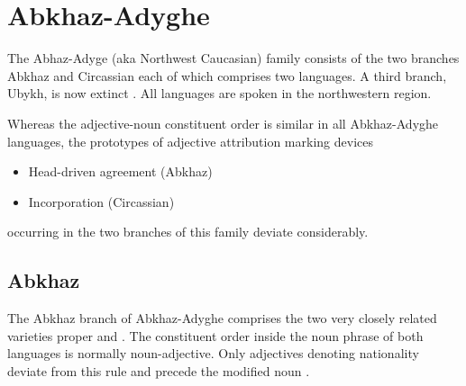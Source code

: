\section{Abkhaz-Adyghe}
The Abhaz-Adyge (aka Northwest Caucasian) family consists of the two branches Abkhaz and Circassian each of which comprises two languages. A third branch, Ubykh, is now extinct \citep[220, 233]{salminen2007}. All languages are spoken in the northwestern  region.

Whereas the adjective-noun constituent order is similar in all Abkhaz-Adyghe languages, the prototypes of adjective attribution marking devices
\begin{itemize}
\item Head-driven agreement (Abkhaz)
\item Incorporation (Circassian)
\end{itemize}
occurring in the two branches of this family deviate considerably.

\subsection{Abkhaz}
The Abkhaz branch of Abkhaz-Adyghe comprises the two very closely related varieties  proper and . The constituent order inside the noun phrase of both languages is normally noun-adjective. Only adjectives denoting nationality deviate from this rule and precede the modified noun \citep[222]{comrie1981}.

